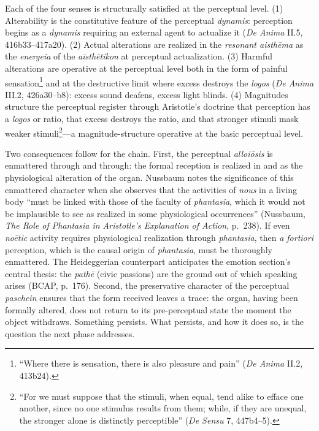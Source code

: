 Each of the four senses is structurally satisfied at the perceptual level. (1) Alterability is the constitutive feature of the perceptual \textit{dynamis}: perception begins as a \textit{dynamis} requiring an external agent to actualize it (\textit{De Anima} II.5, 416b33--417a20). (2) Actual alterations are realized in the \textit{resonant aisthēma} as the \textit{energeia} of the \textit{aisthētikon} at perceptual actualization. (3) Harmful alterations are operative at the perceptual level both in the form of painful sensation\footnote{``Where there is sensation, there is also pleasure and pain'' (\textit{De Anima} II.2, 413b24).} and at the destructive limit where excess destroys the \textit{logos} (\textit{De Anima} III.2, 426a30--b8): excess sound deafens, excess light blinds. (4) Magnitudes structure the perceptual register through Aristotle's doctrine that perception has a \textit{logos} or ratio, that excess destroys the ratio, and that stronger stimuli mask weaker stimuli\footnote{``For we must suppose that the stimuli, when equal, tend alike to efface one another, since no one stimulus results from them; while, if they are unequal, the stronger alone is distinctly perceptible'' (\textit{De Sensu} 7, 447b4--5).}---a magnitude-structure operative at the basic perceptual level.

Two consequences follow for the chain. First, the perceptual \textit{alloiōsis} is enmattered through and through: the formal reception is realized in and as the physiological alteration of the organ. Nussbaum notes the significance of this enmattered character when she observes that the activities of \textit{nous} in a living body ``must be linked with those of the faculty of \textit{phantasia}, which it would not be implausible to see as realized in some physiological occurrences'' (Nussbaum, \textit{The Role of Phantasia in Aristotle's Explanation of Action}, p.~238). If even \textit{noētic} activity requires physiological realization through \textit{phantasia}, then \textit{a fortiori} perception, which is the causal origin of \textit{phantasia}, must be thoroughly enmattered. The Heideggerian counterpart anticipates the emotion section's central thesis: the \textit{pathē} (civic passions) are the ground out of which speaking arises (BCAP, p.~176). Second, the preservative character of the perceptual \textit{paschein} ensures that the form received leaves a trace: the organ, having been formally altered, does not return to its pre-perceptual state the moment the object withdraws. Something persists. What persists, and how it does so, is the question the next phase addresses.

